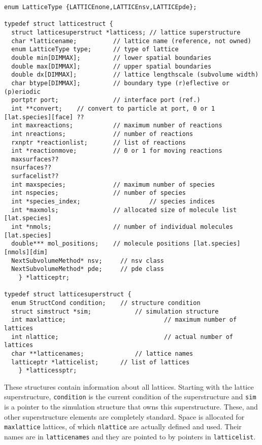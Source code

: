 \documentclass {book}
\begin{document}
\begin{lstlisting}
enum LatticeType {LATTICEnone,LATTICEnsv,LATTICEpde};

typedef struct latticestruct {
  struct latticesuperstruct *latticess;	// lattice superstructure
  char *latticename;          // lattice name (reference, not owned)
  enum LatticeType type;      // type of lattice
  double min[DIMMAX];         // lower spatial boundaries
  double max[DIMMAX];         // upper spatial boundaries
  double dx[DIMMAX];          // lattice lengthscale (subvolume width)
  char btype[DIMMAX];         // boundary type (r)eflective or (p)eriodic
  portptr port;               // interface port (ref.)
  int **convert;    // convert to particle at port, 0 or 1 [lat.species][face] ??
  int maxreactions;           // maximum number of reactions
  int nreactions;             // number of reactions
  rxnptr *reactionlist;       // list of reactions
  int *reactionmove;          // 0 or 1 for moving reactions
  maxsurfaces??
  nsurfaces??
  surfacelist??
  int maxspecies;             // maximum number of species
  int nspecies;               // number of species
  int *species_index;					// species indices
  int *maxmols;               // allocated size of molecule list [lat.species]
  int *nmols;                 // number of individual molecules [lat.species]
  double*** mol_positions;    // molecule positions [lat.species][nmols][dim]
  NextSubvolumeMethod* nsv;		// nsv class
  NextSubvolumeMethod* pde;		// pde class
	} *latticeptr;

typedef struct latticesuperstruct {
  enum StructCond condition;	// structure condition
  struct simstruct *sim;			// simulation structure
  int maxlattice;							// maximum number of lattices
  int nlattice;								// actual number of lattices
  char **latticenames;				// lattice names
  latticeptr *latticelist;		// list of lattices
	} *latticessptr;
\end{lstlisting}

These structures contain information about all lattices.  Starting with the lattice superstructure, \texttt{condition} is the current condition of the superstructure and \texttt{sim} is a pointer to the simulation structure that owns this superstructure.  These, and other superstructure elements are completely standard.  Space is allocated for \texttt{maxlattice} lattices, of which \texttt{nlattice} are actually defined and used.  Their names are in \texttt{latticenames} and they are pointed to by pointers in \texttt{latticelist}.
\end{document}
